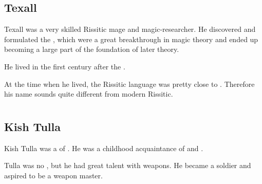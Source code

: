 \section{Texall}
Texall was a very skilled Rissitic mage and magic-researcher. 
He discovered and formulated the , which were a great breakthrough in magic theory and ended up becoming a large part of the foundation of later  theory. 

He lived in the first century after the . 

At the time when he lived, the Rissitic language was pretty close to \Ortaican. 
Therefore his name sounds quite different from modern Rissitic. 























\chapter{\Ortaicans}















\section{Kish Tulla}
Kish Tulla was a \dax of \Yormis.
He was a childhood acquaintance of  and . 

Tulla was no \rethyax, but he had great talent with weapons.
He became a soldier and aspired to be a weapon master.















